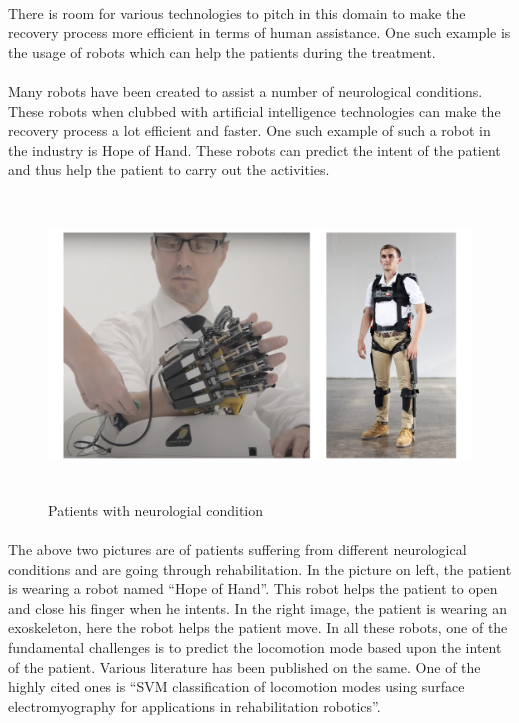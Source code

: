 \documentclass[12pt]{article}
\begin{document}
\paragraph{}
There is room for various technologies to pitch in this domain to make the recovery process more efficient in terms of human assistance. One such example is the usage of robots which can help the patients during the treatment.

\paragraph{}
Many robots have been created to assist a number of neurological conditions. These robots when clubbed with artificial intelligence technologies can make the recovery process a lot efficient and faster. One such example of such a robot in the industry is Hope of Hand. These robots can predict the intent of the patient and thus help the patient to carry out the activities.

\begin{figure}[h]
	\begin{center}
		\includegraphics[height=8cm,width=15cm]{Patients}
	\end{center}
	\caption{Patients with neurologial condition}
\end{figure}

\paragraph{}
The above two pictures are of patients suffering from different neurological conditions and are going through rehabilitation. In the picture on left, the patient is wearing a robot named “Hope of Hand”. This robot helps the patient to open and close his finger when he intents. In the right image, the patient is wearing an exoskeleton, here the robot helps the patient move. In all these robots, one of the fundamental challenges is to predict the locomotion mode based upon the intent of the patient. Various literature has been published on the same. One of the highly cited ones is “SVM classification of locomotion modes using surface electromyography for applications in rehabilitation robotics”.\cite{E. Ceseracciu}  
\end{document}
